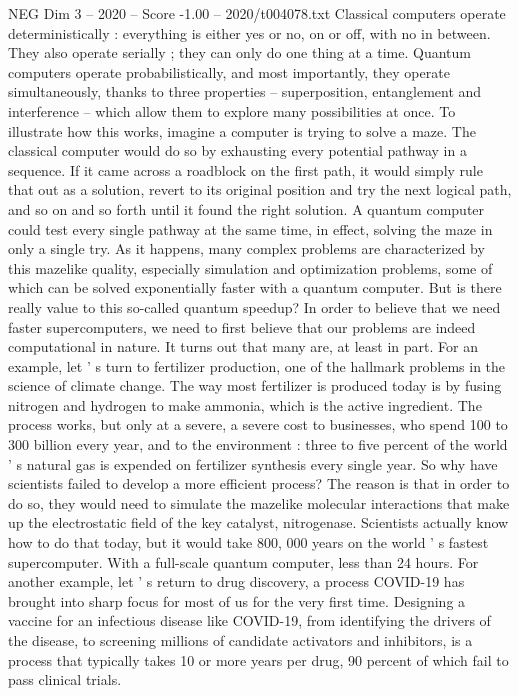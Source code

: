 \begin{textsample}{NEG Dim 3 – 2020 – Score -1.00 – 2020/t004078.txt}
Classical computers operate deterministically : everything is either yes or no, on or off, with no in between.
They also operate serially ; they can only do one thing at a time.
Quantum computers operate probabilistically, and most importantly, they operate simultaneously, thanks to three properties -- superposition, entanglement and interference -- which allow them to explore many possibilities at once.
To illustrate how this works, imagine a computer is trying to solve a maze.
The classical computer would do so by exhausting every potential pathway in a sequence.
If it came across a roadblock on the first path, it would simply rule that out as a solution, revert to its original position and try the next logical path, and so on and so forth until it found the right solution.
A quantum computer could test every single pathway at the same time, in effect, solving the maze in only a single try.
As it happens, many complex problems are characterized by this mazelike quality, especially simulation and optimization problems, some of which can be solved exponentially faster with a quantum computer.
But is there really value to this so-called quantum speedup?
In order to believe that we need faster supercomputers, we need to first believe that our problems are indeed computational in nature.
It turns out that many are, at least in part.
For an example, let ' s turn to fertilizer production, one of the hallmark problems in the science of climate change.
The way most fertilizer is produced today is by fusing nitrogen and hydrogen to make ammonia, which is the active ingredient.
The process works, but only at a severe, a severe cost to businesses, who spend 100 to 300 billion every year, and to the environment : three to five percent of the world ' s natural gas is expended on fertilizer synthesis every single year.
So why have scientists failed to develop a more efficient process?
The reason is that in order to do so, they would need to simulate the mazelike molecular interactions that make up the electrostatic field of the key catalyst, nitrogenase.
Scientists actually know how to do that today, but it would take 800, 000 years on the world ' s fastest supercomputer.
With a full-scale quantum computer, less than 24 hours.
For another example, let ' s return to drug discovery, a process COVID-19 has brought into sharp focus for most of us for the very first time.
Designing a vaccine for an infectious disease like COVID-19, from identifying the drivers of the disease, to screening millions of candidate activators and inhibitors, is a process that typically takes 10 or more years per drug, 90 percent of which fail to pass clinical trials.

\end{textsample}
